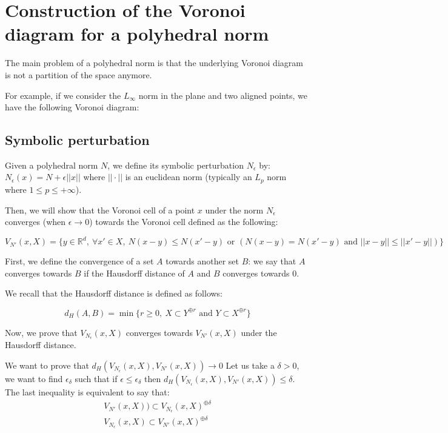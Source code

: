 \section{Construction of the Voronoi diagram for a polyhedral norm}

The main problem of a polyhedral norm is that the underlying Voronoi diagram is
not a partition of the space anymore.

For example, if we consider the $ L_\infty $ norm in the plane and two aligned
points, we have the following Voronoi diagram:


\subsection{Symbolic perturbation}

Given a polyhedral norm $ N $, we define its symbolic perturbation $ N_\epsilon
$ by: $ N_\epsilon (x) = N + \epsilon || x || $ where $ || \cdot || $ is an
euclidean norm (typically an $ L_p $ norm where $ 1 \leq p \leq +\infty $).

Then, we will show that the Voronoi cell of a point $ x $ under the norm $
N_\epsilon $ converges (when $ \epsilon \rightarrow 0 $) towards the Voronoi
cell defined as the following:

$$ V_{N'}(x, X) = \{ y \in \mathbb{R}^d,~\forall x' \in X,~N(x - y) \leq N(x'
-y) \text{ or } (N(x - y) = N(x' - y) \text { and } || x -y || \leq || x' - y ||) \} $$

First, we define the convergence of a set $ A $ towards another set $ B $: we
say that $ A $ converges towards $ B $ if the Hausdorff distance of $ A $ and $
B $ converges towards $ 0 $.

We recall that the Hausdorff distance is defined as follows:

$$ d_H(A, B) = \min \{ r \geq 0,~X \subset Y^{\oplus r} \text{ and } Y \subset
X^{\oplus r} \} $$

Now, we prove that $ V_{N_\epsilon}(x, X) $ converges towards $ V_{N'}(x, X) $
under the Hausdorff distance.

We want to prove that $ d_H(V_{N_\epsilon}(x, X), V_{N'}(x, X)) \rightarrow 0 $
Let us take a $ \delta > 0 $, we want to find $ \epsilon_\delta $ such that if $
\epsilon \leq \epsilon_\delta $ then $ d_H(V_{N_\epsilon}(x, X), V_{N'}(x, X))
\leq \delta $. The last inequality is equivalent to say that:
\begin{align}
    V_{N'}(x, X)) \subset V_{N_\epsilon}(x, X)^{\oplus \delta} \\
    V_{N_\epsilon}(x, X) \subset V_{N'}(x, X)^{\oplus \delta}
    \label{eqn:haussdorf-voronoi1}
\end{align}

